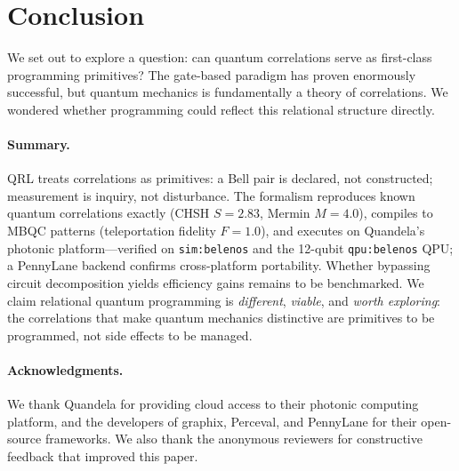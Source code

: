 \documentclass[submission,copyright,creativecommons]{eptcs}
\newcommand{\qrl}{\textsc{QRL}}
\newcommand{\mbqc}{\textsc{MBQC}}
\begin{document}

\section{Conclusion}
\label{sec:conclusion}

We set out to explore a question: can quantum correlations serve as
first-class programming primitives? The gate-based paradigm has proven
enormously successful, but quantum mechanics is fundamentally a theory
of correlations. We wondered whether programming could reflect this
relational structure directly.

\paragraph{Summary.}
\qrl{} treats correlations as primitives: a Bell pair is declared, not
constructed; measurement is inquiry, not disturbance. The formalism
reproduces known quantum correlations exactly (CHSH $S = 2.83$, Mermin
$M = 4.0$), compiles to \mbqc{} patterns (teleportation fidelity $F = 1.0$),
and executes on Quandela's photonic platform---verified on
\texttt{sim:belenos} and the 12-qubit \texttt{qpu:belenos} QPU; a PennyLane
backend confirms cross-platform portability. Whether bypassing circuit
decomposition yields efficiency gains remains to be benchmarked.
We claim relational quantum programming is \emph{different}, \emph{viable},
and \emph{worth exploring}: the correlations that make quantum mechanics
distinctive are primitives to be programmed, not side effects to be managed.


\paragraph{Acknowledgments.}
We thank Quandela for providing cloud access to their photonic
computing platform, and the developers of graphix, Perceval, and PennyLane
for their open-source frameworks. We also thank the anonymous
reviewers for constructive feedback that improved this paper.




\end{document}
